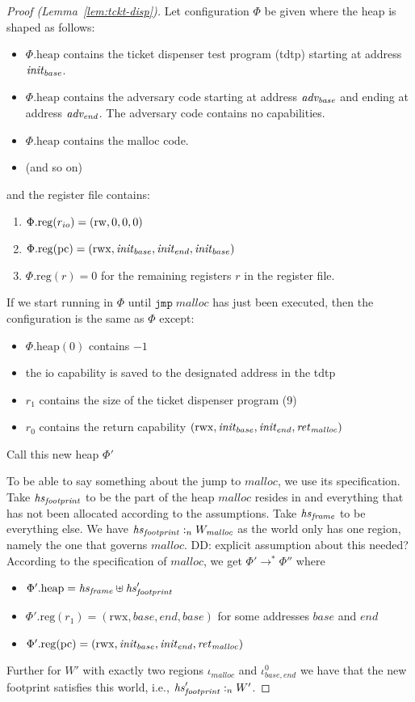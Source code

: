 \documentclass[a4paper]{article}
\newcommand\dominique[1]{{\color{purple} \sf \footnotesize {DD: #1}}\\}
\newcommand{\var}[1]{\mathit{#1}}
\newcommand{\pcreg}{\mathrm{pc}}
\newcommand{\heap}{\var{heap}}
\newcommand{\plainproj}[1]{\mathrm{#1}}
\newcommand{\memheap}[1][\Phi]{#1.\plainproj{heap}}
\newcommand{\memreg}[1][\Phi]{#1.\plainproj{reg}}
\newcommand{\heapSat}[3][\heap]{#1 :_{#2} #3}
\newcommand{\codelabel}[1]{\mathit{#1}}
\newcommand{\malloc}{\codelabel{malloc}}
\newcommand{\zinstr}[1]{\mathtt{#1}}
\newcommand{\oneinstr}[2]{\zinstr{#1} \; #2}
\newcommand{\jmp}[1]{\oneinstr{jmp}{#1}}
\newcommand{\plainperm}[1]{\mathrm{#1}}
\newcommand{\readwrite}{\plainperm{rw}}
\newcommand{\rwx}{\plainperm{rwx}}
\newcommand{\step}[1][]{\rightarrow_{#1}}
\begin{document}
 \begin{proof}[Proof (Lemma~\ref{lem:tckt-disp})]
Let configuration $\Phi$ be given where the heap is shaped as follows:
\begin{itemize}
\item $\memheap$ contains the ticket dispenser test program (tdtp) starting at address $\initb$.
\item $\memheap$ contains the adversary code starting at address $\advb$ and ending at address $\adve$. The adversary code contains no capabilities.
\item $\memheap$ contains the malloc code.
\item (and so on) %
\end{itemize}
and the register file contains:
\begin{enumerate}
\item $\memreg(\rio) = (\readwrite,0,0,0)$ 
\item $\memreg(\pcreg) = (\rwx,\initb, \inite, \initb)$
\item $\memreg(r) = 0$ for the remaining registers $r$ in the register file.
\end{enumerate}

If we start running in $\Phi$ until $\jmp{\malloc}$ has just been executed, then the configuration is the same as $\Phi$ except:
\begin{itemize}
\item $\memheap(0)$ contains $-1$
\item the io capability is saved to the designated address in the tdtp
\item $r_1$ contains the size of the ticket dispenser program (9)
\item $r_0$ contains the return capability $(\rwx,\initb,\inite, \retm)$
\end{itemize}
Call this new heap $\Phi'$

To be able to say something about the jump to $\malloc$, we use its specification. Take $\hsfoot$ to be the part of the heap $\malloc$ resides in and everything that has not been allocated according to the assumptions. Take $\hsframe$ to be everything else. We have $\heapSat[\hsfoot]{n}{W_\var{\malloc}}$ as the world only has one region, namely the one that governs $\malloc$.\dominique{explicit assumption about this needed?} According to the specification of $\malloc$, we get $\Phi' \step^* \Phi''$ where
\begin{itemize}
\item $\memheap[\Phi'] = \hsframe \uplus \hsfoot'$
\item $\memreg[\Phi'](r_1) = (\rwx,\var{base},\var{end},\var{base})$ for some addresses $\var{base}$ and $\var{end}$
\item $\memreg[\Phi'](\pcreg) = (\rwx,\initb,\inite,\retm)$
\end{itemize}
Further for $W'$ with exactly two regions $\iota_\malloc$ and $\iota_{\var{base},\var{end}}^0$ we have that the new footprint satisfies this world, i.e., $\heapSat[\hsfoot']{n}{W'}$.


\end{proof}
\end{document}

